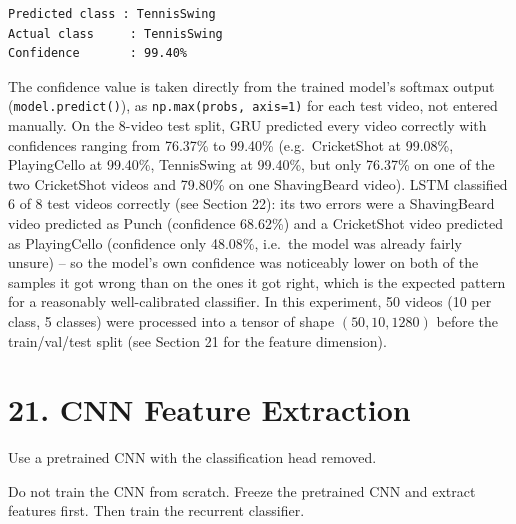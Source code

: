 \documentclass[10pt]{article}
\begin{document}
\begin{verbatim}
Predicted class : TennisSwing
Actual class     : TennisSwing
Confidence       : 99.40%
\end{verbatim}

The confidence value is taken directly from the trained model's softmax
output (\texttt{model.predict()}), as \texttt{np.max(probs, axis=1)} for
each test video, not entered manually. On the 8-video test split, GRU
predicted every video correctly with confidences ranging from 76.37\% to
99.40\% (e.g.\ CricketShot at 99.08\%, PlayingCello at 99.40\%, TennisSwing
at 99.40\%, but only 76.37\% on one of the two CricketShot videos and
79.80\% on one ShavingBeard video). LSTM classified 6 of 8 test videos
correctly (see Section 22): its two errors were a ShavingBeard video
predicted as Punch (confidence 68.62\%) and a CricketShot video predicted as
PlayingCello (confidence only 48.08\%, i.e.\ the model was already fairly
unsure) -- so the model's own confidence was noticeably lower on both of the
samples it got wrong than on the ones it got right, which is the expected
pattern for a reasonably well-calibrated classifier. In this experiment, 50
videos (10 per class, 5 classes) were processed into a tensor of shape
$(50, 10, 1280)$ before the train/val/test split (see Section 21 for the
feature dimension).

\section*{21. CNN Feature Extraction}

Use a pretrained CNN with the classification head removed.

\begin{center}
\end{center}

Do not train the CNN from scratch. Freeze the pretrained CNN and extract
features first. Then train the recurrent classifier.
\end{document}
